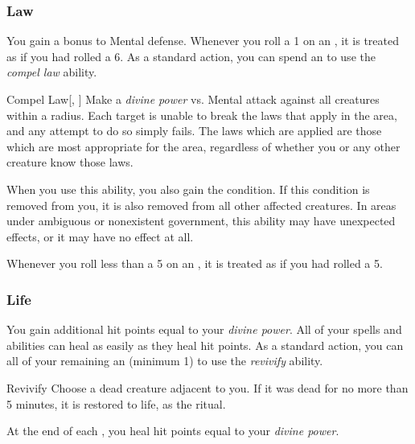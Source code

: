         \subsubsection{Law}
             You gain a  bonus to Mental defense.
             Whenever you roll a 1 on an , it is treated as if you had rolled a 6.
             As a standard action, you can spend an  to use the \textit{compel law} ability.
            \begin{ability}{Compel Law}[, ]
                Make a \textit{divine power} vs. Mental attack against all creatures within a \arealarge radius.
                \hit Each target is unable to break the laws that apply in the area, and any attempt to do so simply fails.
                The laws which are applied are those which are most appropriate for the area, regardless of whether you or any other creature know those laws.

                When you use this ability, you also gain the condition.
                If this condition is removed from you, it is also removed from all other affected creatures.
                In areas under ambiguous or nonexistent government, this ability may have unexpected effects, or it may have no effect at all.
            \end{ability}
             Whenever you roll less than a 5 on an , it is treated as if you had rolled a 5.

        \subsubsection{Life}
             You gain additional hit points equal to your \textit{divine power}.
             All of your  spells and abilities can heal  as easily as they heal hit points.
             As a standard action, you can all of your remaining an  (minimum 1) to use the \textit{revivify} ability.
            \begin{ability}{Revivify}
                Choose a dead creature adjacent to you.
                If it was dead for no more than 5 minutes, it is restored to life, as the  ritual.
            \end{ability}
             At the end of each , you heal hit points equal to your \textit{divine power}.


